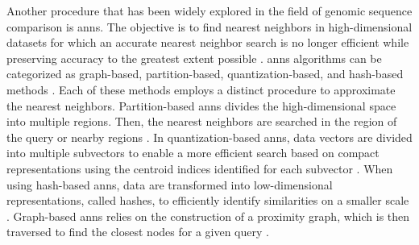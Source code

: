 Another procedure that has been widely explored in the field of genomic sequence comparison is \acrfull{anns}. The objective is to find nearest neighbors in high-dimensional datasets for which an accurate nearest neighbor search is no longer efficient while preserving accuracy to the greatest extent possible \cite{Wan1}. \acrshort{anns} algorithms can be categorized as graph-based, partition-based, quantization-based, and hash-based methods \cite{Wan1}. Each of these methods employs a distinct procedure to approximate the nearest neighbors. Partition-based \acrshort{anns} divides the high-dimensional space into multiple regions. Then, the nearest neighbors are searched in the region of the query or nearby regions \cite{Li1}. In quantization-based \acrshort{anns}, data vectors are divided into multiple subvectors to enable a more efficient search based on compact representations using the centroid indices identified for each subvector \cite{Pen1}. When using hash-based \acrshort{anns}, data are transformed into low-dimensional representations, called hashes, to efficiently identify similarities on a smaller scale \cite{Li1}. Graph-based \acrshort{anns} relies on the construction of a proximity graph, which is then traversed to find the closest nodes for a given query \cite{Wan1}.

